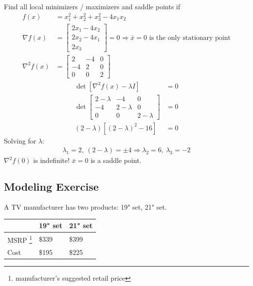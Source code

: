\documentclass[11pt]{article}
\numberwithin{equation}{section}
\begin{document}
\begin{example}
    Find all local minimizers / maximizers and saddle points if \begin{align*}
        f(x) &= x_{1}^{2}+x_{2}^{2}+x_{3}^{2}-4 x_{1} x_{2} \\
        \nabla f(x)&= \left[\begin{array}{l}
            2 x_{1}-4 x_{2} \\
            2 x_{2}-4 x_{1} \\
            2 x_{3}
            \end{array}\right] = 0 \Rightarrow \bar{x}=0 \text{ is the only stationary point} \\
        \nabla^{2} f(x) &= \left[\begin{array}{ccc}
            2 & -4 & 0 \\
            -4 & 2 & 0 \\
            0 & 0 & 2
            \end{array}\right]
    \end{align*}
    \begin{align*}
        \operatorname{det}\left[ \nabla^{2} f(x) - \lambda I \right] &= 0\\
        \operatorname{det} \left[\begin{array}{ccc}
            2-\lambda & -4 & 0 \\
            -4 & 2-\lambda & 0 \\
            0 & 0 & 2-\lambda
            \end{array}\right] &= 0\\
            (2-\lambda)\left[ (2-\lambda)^2 -16 \right] &= 0
    \end{align*}
    Solving for $\lambda$:\begin{align*}
        \lambda_{1}=2, \ (2-\lambda) = \pm 4 \Rightarrow \lambda_{2}=6, \ \lambda_{3}=-2
    \end{align*}
    $\nabla^{2} f(0)$ is indefinite! $\bar{x}=0$ is a saddle point.
\end{example}

\subsection{Modeling Exercise}
A TV manufacturer has two products: 19" set, 21" set.

\begin{savenotes}
    \begin{table}[H]
        \centering
        \begin{tabular}{l|ll}
             & 19" set & 21" set \\ \hline
        MSRP \footnote{manufacturer's suggested retail price} & \$339   & \$399   \\
        Cost & \$195   & \$225  
        \end{tabular}
    \end{table}
\end{savenotes}
\end{document}
